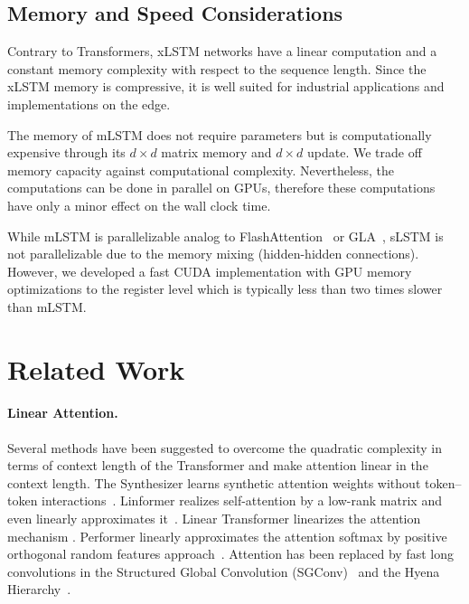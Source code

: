 \documentclass[dvipsnames]{article}
\begin{document}
\subsection{Memory and Speed Considerations}

Contrary to Transformers, xLSTM networks have a linear 
computation and a constant memory complexity
with respect to the sequence length.
Since the xLSTM memory is compressive, it is well suited
for industrial applications and implementations on the edge.

The memory of mLSTM does not require parameters but is
computationally expensive through its $d \times d$ matrix memory
and $d \times d$ update. We trade off memory 
capacity against computational complexity. 
Nevertheless, the computations can be done in parallel on GPUs, therefore
these computations have only a minor effect on the wall clock time.


While mLSTM is parallelizable 
analog to FlashAttention~\citep{Dao:22,Dao:23} or GLA~\citep{Yang:23arxiv},
sLSTM is not parallelizable due to 
the memory mixing (hidden-hidden connections).
However, we developed a fast CUDA implementation with 
GPU memory optimizations to the register level which is
typically less than two times slower than mLSTM.


\section{Related Work}
\label{sec:related}

\paragraph{Linear Attention.}
Several methods have been suggested to overcome the
quadratic complexity in terms of context length of the Transformer
and make attention linear in the context length.
The Synthesizer learns synthetic attention weights
without token--token interactions~\citep{Tay:20arxiv}.
Linformer realizes self-attention by a low-rank matrix and even 
linearly approximates it~\citep{Wang:20arxiv}.
Linear Transformer linearizes the attention mechanism
\citep{Katharopoulos:20}.
Performer linearly approximates the attention softmax by 
positive orthogonal random features approach~\citep{Choromanski:21}.
Attention has been replaced by fast long convolutions
in the Structured Global Convolution (SGConv)~\citep{Li:22}
and the Hyena Hierarchy~\citep{Poli:23}.
\end{document}
